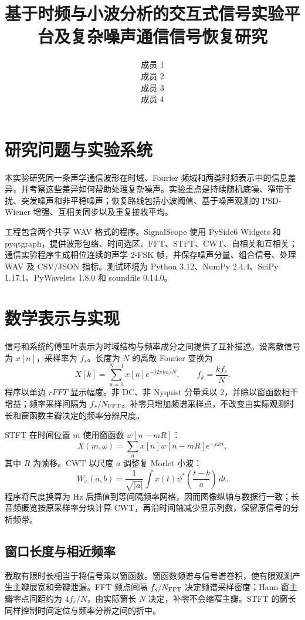 \documentclass[12pt,a4paper]{article}
\title{\bfseries 基于时频与小波分析的交互式信号实验平台及复杂噪声通信信号恢复研究}
\author{成员 1\\
成员 2\\
成员 3\\
成员 4}
\date{}
\begin{document}
\maketitle
\thispagestyle{fancy}

\section{研究问题与实验系统}
本实验研究同一条声学通信波形在时域、Fourier 频域和两类时频表示中的信息差异，并考察这些差异如何帮助处理复杂噪声。实验重点是持续随机底噪、窄带干扰、突发噪声和非平稳噪声；恢复路线包括小波阈值、基于噪声观测的 PSD-Wiener 增强、互相关同步以及重复接收平均。

工程包含两个共享 WAV 格式的程序。SignalScope 使用 PySide6 Widgets 和 pyqtgraph，提供波形包络、时间选区、FFT、STFT、CWT、自相关和互相关；通信实验程序生成相位连续的声学 2-FSK 帧，并保存噪声分量、组合信号、处理 WAV 及 CSV/JSON 指标。测试环境为 Python 3.12、NumPy 2.4.4、SciPy 1.17.1、PyWavelets 1.8.0 和 soundfile 0.14.0。

\section{数学表示与实现}
信号和系统的傅里叶表示为时域结构与频率成分之间提供了互补描述\supercite{oppenheim1997}。设离散信号为 $x[n]$，采样率为 $f_s$。长度为 $N$ 的离散 Fourier 变换为
\begin{equation}
X[k]=\sum_{n=0}^{N-1}x[n]e^{-j2\pi kn/N},\qquad f_k=\frac{k f_s}{N}.
\end{equation}
程序以单边 $rFFT$ 显示幅度。非 DC、非 Nyquist 分量乘以 2，并除以窗函数相干增益；频率采样间隔为 $f_s/N_{\rm FFT}$。补零只增加频谱采样点，不改变由实际观测时长和窗函数主瓣决定的频率分辨尺度。

STFT 在时间位置 $m$ 使用窗函数 $w[n-mR]$：
\begin{equation}
X(m,\omega)=\sum_n x[n]w[n-mR]e^{-j\omega n},
\end{equation}
其中 $R$ 为帧移。CWT 以尺度 $a$ 调整复 Morlet 小波：
\begin{equation}
W_x(a,b)=\frac{1}{\sqrt{|a|}}\int x(t)\psi^*\!\left(\frac{t-b}{a}\right)\,dt.
\end{equation}
程序将尺度换算为 Hz 后插值到等间隔频率网格，因而图像纵轴与数据行一致；长音频概览按原采样率分块计算 CWT，再沿时间轴减少显示列数，保留原信号的分析频带。

\subsection{窗口长度与相近频率}
截取有限时长相当于将信号乘以窗函数。窗函数频谱与信号谱卷积，使有限观测产生主瓣展宽和旁瓣泄漏。FFT 频点间隔 $f_s/N_{\rm FFT}$ 决定频谱采样密度；Hann 窗主瓣零点间距约为 $4f_s/N$，由实际窗长 $N$ 决定，补零不会缩窄主瓣。STFT 的窗长同样控制时间定位与频率分辨之间的折中。
\end{document}
